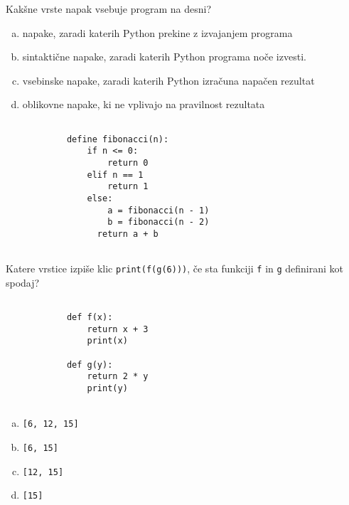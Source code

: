\documentclass[arhiv, 10pt]{../izpit}
\newcommand{\inlinepy}[1]{\texttt{#1}}
\begin{document}
        \naloga*
        \begin{multicols}{2}
        \noindent
        Kakšne vrste napak vsebuje program na desni?

        \begin{enumerate}[(a)]
\item napake, zaradi katerih Python prekine z izvajanjem programa
\item sintaktične napake, zaradi katerih Python programa noče izvesti.
\item vsebinske napake, zaradi katerih Python izračuna napačen rezultat
\item oblikovne napake, ki ne vplivajo na pravilnost rezultata
\end{enumerate}

        \columnbreak

        \begin{verbatim}
        
            define fibonacci(n):
                if n <= 0:
                    return 0
                elif n == 1
                    return 1
                else:
                    a = fibonacci(n - 1)
                    b = fibonacci(n - 2)
                  return a + b
            
        \end{verbatim}

        \end{multicols}

    
        \naloga*
        Katere vrstice izpiše klic \inlinepy{print(f(g(6)))}, če sta funkciji \inlinepy{f} in \inlinepy{g} definirani kot spodaj?

        \begin{multicols}{2}
        \begin{verbatim}
        
            def f(x):
                return x + 3
                print(x)

            def g(y):
                return 2 * y
                print(y)
        
        \end{verbatim}

        \begin{enumerate}[(a)]
\item \inlinepy{[6, 12, 15]}
\item \inlinepy{[6, 15]}
\item \inlinepy{[12, 15]}
\item \inlinepy{[15]}
\end{enumerate}

        \end{multicols}
    
\end{document}
